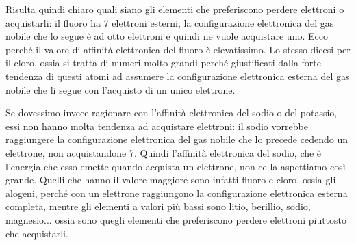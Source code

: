 Risulta quindi chiaro quali siano gli elementi che preferiscono perdere elettroni o acquistarli: il fluoro ha 7 elettroni esterni, la configurazione elettronica del gas nobile che lo segue è ad otto elettroni e quindi ne vuole acquistare uno. Ecco perché il valore di affinità elettronica del fluoro è elevatissimo. Lo stesso dicesi per il cloro, ossia si tratta di numeri molto grandi perché giustificati dalla forte tendenza di questi atomi ad assumere la configurazione elettronica esterna del gas nobile che li segue con l'acquisto di un unico elettrone.

\vspace{0.2cm}Se dovessimo invece ragionare con l'affinità elettronica del sodio o del potassio, essi non hanno molta tendenza ad acquistare elettroni: il sodio vorrebbe raggiungere la configurazione elettronica del gas nobile che lo precede cedendo un elettrone, non acquistandone 7. Quindi l'affinità elettronica del sodio, che è l'energia che esso emette quando acquista un elettrone, non ce la aspettiamo così grande. Quelli che hanno il valore maggiore sono infatti fluoro e cloro, ossia gli alogeni, perché con un elettrone raggiungono la configurazione elettronica esterna completa, mentre gli elementi a valori più bassi sono litio, berillio, sodio, magnesio... ossia sono quegli elementi che preferiscono perdere elettroni piuttosto che acquistarli.

\vspace{-1cm}

